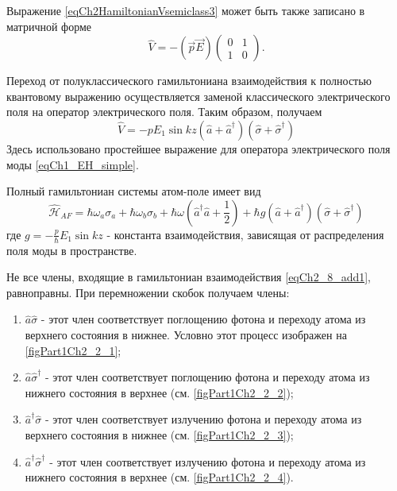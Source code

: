 Выражение \eqref{eqCh2HamiltonianVsemiclass3} может быть также
записано в матричной форме 
\begin{equation}
\hat{V} = - \left(\vec{p} \vec{E}\right)
\left(
\begin{array} {cc}
0 & 1  
\\
1 & 0 
\end{array}
\right).
\label{eqCh2_8}
\end{equation}

Переход от полуклассического гамильтониана взаимодействия к полностью
квантовому выражению осуществляется заменой классического
электрического поля на оператор электрического поля. Таким
образом, получаем 
\begin{equation}
\hat{V} = - p E_1 \sin k z \left(\hat{a} + \hat{a}^{\dag}\right)
\left(\hat{\sigma} + \hat{\sigma}^{\dag}\right)
\label{eqCh2_8_add1}
\end{equation}
Здесь использовано простейшее выражение для оператора электрического
поля моды \eqref{eqCh1_EH_simple}. 

Полный гамильтониан системы атом-поле имеет вид
\begin{equation}
\hat{\mathcal{H}}_{AF} = 
\hbar \omega_a \sigma_a + \hbar \omega_b \sigma_b +
\hbar \omega 
\left(\hat{a}^{\dag}\hat{a} + \frac{1}{2}\right)
+ \hbar g \left(\hat{a} + \hat{a}^{\dag}\right)
\left(\hat{\sigma} + \hat{\sigma}^{\dag}\right)
\nonumber
\end{equation}
где $g = -\frac{p}{\hbar}E_1 \sin k z$ - константа взаимодействия,
зависящая от распределения поля моды в пространстве.  










Не все члены, входящие в гамильтониан взаимодействия
\eqref{eqCh2_8_add1}, равноправны. При перемножении скобок получаем
члены: 
\begin{enumerate}
\item $\hat{a}\hat{\sigma}$ - этот член соответствует поглощению
  фотона и переходу атома из верхнего состояния в нижнее. Условно этот
  процесс изображен на \autoref{figPart1Ch2_2_1};  
\item $\hat{a}\hat{\sigma}^{\dag}$ - этот член соответствует поглощению
  фотона и переходу атома из нижнего состояния в верхнее (см. \autoref{figPart1Ch2_2_2});  
\item $\hat{a}^{\dag}\hat{\sigma}$ - этот член соответствует излучению
  фотона и переходу атома из верхнего состояния в нижнее (см. \autoref{figPart1Ch2_2_3}); 
\item $\hat{a}^{\dag}\hat{\sigma}^{\dag}$ - этот член соответствует
  излучению фотона и переходу атома из нижнего состояния в верхнее (см. \autoref{figPart1Ch2_2_4}). 
\end{enumerate}


